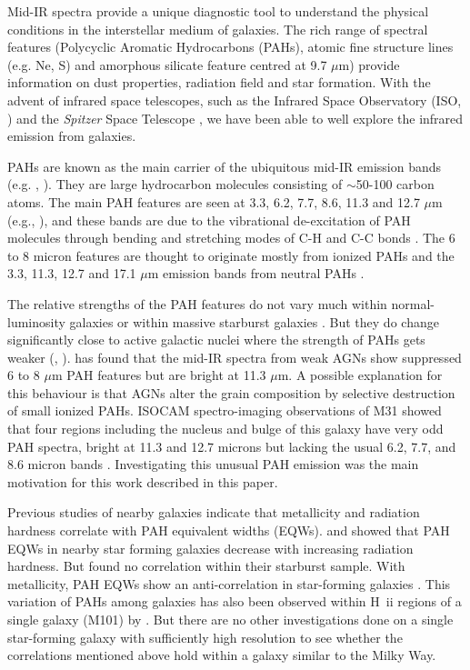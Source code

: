 Mid-IR spectra provide a unique diagnostic tool to understand the physical conditions in the interstellar medium of galaxies. The rich range of spectral features (Polycyclic Aromatic Hydrocarbons (PAHs), atomic fine structure lines (e.g. Ne, S) and amorphous silicate feature centred at 9.7 $\mu$m) provide information on dust properties, radiation field and star formation. With the advent of infrared space telescopes, such as the Infrared Space Observatory (ISO, \citealt{Kessler1996}) and the {\em Spitzer} Space Telescope \citep{spitzer2004}, we have been able to well explore the infrared emission from galaxies. 

PAHs are known as the main carrier of the ubiquitous mid-IR emission bands (e.g. \citealt{Allamandola1989}, \citealt{Tielens2008}). They are large hydrocarbon molecules consisting of $\sim$50-100 carbon atoms. The main PAH features are seen at 3.3, 6.2, 7.7, 8.6, 11.3 and 12.7 $\mu $m (e.g.\citealt{Mattila1996}, \citealt{Peeters2002}), and these bands are due to the vibrational de-excitation of PAH molecules  through bending and stretching modes of C-H and C-C bonds \citep{Tielens:2005lr}. The 6 to 8 micron features are thought to originate mostly from ionized PAHs and the 3.3, 11.3, 12.7 and 17.1 $\mu$m emission bands from neutral PAHs \citep{Peeters2002}. 


The relative strengths of the PAH features do not vary much within normal-luminosity galaxies \citep{Smith:2007lr} or within massive starburst galaxies \citep{Brandl2006}. But they do change significantly close to active galactic nuclei where the strength of PAHs gets weaker (\citealt{Roche1991}, \citealt{Smith:2007lr}). \citet{Smith:2007lr} has found that the mid-IR spectra from weak AGNs show suppressed 6 to 8 $\mu$m PAH features but are bright at 11.3 $\mu$m. A possible explanation for this behaviour is that AGNs alter the grain composition by selective destruction of small ionized PAHs. ISOCAM spectro-imaging observations of M31\citep{1998Cesarsky} showed that four regions including the nucleus and bulge of this galaxy have very odd PAH spectra, bright at 11.3 and 12.7 microns but lacking the usual 6.2, 7.7, and 8.6 micron bands . Investigating this unusual PAH emission was the main motivation for this work described in this paper. 


Previous studies of nearby galaxies indicate that metallicity and radiation hardness correlate with PAH equivalent widths (EQWs). \citet{Smith:2007lr} and \citet{Engelbracht_2008} showed that PAH EQWs in nearby star forming galaxies  decrease with increasing radiation hardness. But  \citet{Brandl2006} found no correlation within their starburst sample.  With metallicity, PAH EQWs show an anti-correlation in star-forming galaxies \citep{Marble_2010}. This variation of PAHs among galaxies has also been observed within H~{\sc ii} regions of a single galaxy (M101) by \citet{Gordon:2008lr}. But there are no other investigations done on a single star-forming galaxy with sufficiently high resolution to see whether the correlations mentioned above hold within a galaxy similar to the Milky Way.


